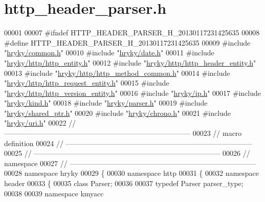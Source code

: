 \hypertarget{http__header__parser_8h_source}{\section{http\-\_\-header\-\_\-parser.\-h}
}

\begin{DoxyCode}
00001 
00007 \textcolor{preprocessor}{#ifndef HTTP\_HEADER\_PARSER\_H\_20130117231425635}
00008 \textcolor{preprocessor}{}\textcolor{preprocessor}{#define HTTP\_HEADER\_PARSER\_H\_20130117231425635}
00009 \textcolor{preprocessor}{}\textcolor{preprocessor}{#include "\hyperlink{common_8h}{hryky/common.h}"}
00010 \textcolor{preprocessor}{#include "\hyperlink{date_8h}{hryky/date.h}"}
00011 \textcolor{preprocessor}{#include "\hyperlink{http__entity_8h}{hryky/http/http_entity.h}"}
00012 \textcolor{preprocessor}{#include "\hyperlink{http__header__entity_8h}{hryky/http/http_header_entity.h}"}
00013 \textcolor{preprocessor}{#include "\hyperlink{http__method__common_8h}{hryky/http/http_method_common.h}"}
00014 \textcolor{preprocessor}{#include "\hyperlink{http__request__entity_8h}{hryky/http/http_request_entity.h}"}
00015 \textcolor{preprocessor}{#include "\hyperlink{http__version__entity_8h}{hryky/http/http_version_entity.h}"}
00016 \textcolor{preprocessor}{#include "\hyperlink{ip_8h}{hryky/ip.h}"}
00017 \textcolor{preprocessor}{#include "\hyperlink{kind_8h}{hryky/kind.h}"}
00018 \textcolor{preprocessor}{#include "\hyperlink{parser_8h}{hryky/parser.h}"}
00019 \textcolor{preprocessor}{#include "\hyperlink{shared__ptr_8h}{hryky/shared_ptr.h}"}
00020 \textcolor{preprocessor}{#include "\hyperlink{chrono_8h}{hryky/chrono.h}"}
00021 \textcolor{preprocessor}{#include "\hyperlink{uri_8h}{hryky/uri.h}"}
00022 \textcolor{comment}{//
      ------------------------------------------------------------------------------}
00023 \textcolor{comment}{// macro definition}
00024 \textcolor{comment}{//
      ------------------------------------------------------------------------------}
00025 \textcolor{comment}{//
      ------------------------------------------------------------------------------}
00026 \textcolor{comment}{// namespace}
00027 \textcolor{comment}{//
      ------------------------------------------------------------------------------}
00028 \textcolor{keyword}{namespace }hryky
00029 \{
00030 \textcolor{keyword}{namespace }http
00031 \{
00032 \textcolor{keyword}{namespace }header
00033 \{
00035     \textcolor{keyword}{class }Parser;
00036 
00037     \textcolor{keyword}{typedef} Parser parser\_type;
00038 
00039 \textcolor{keyword}{namespace }kmyacc

\end{DoxyCode}
